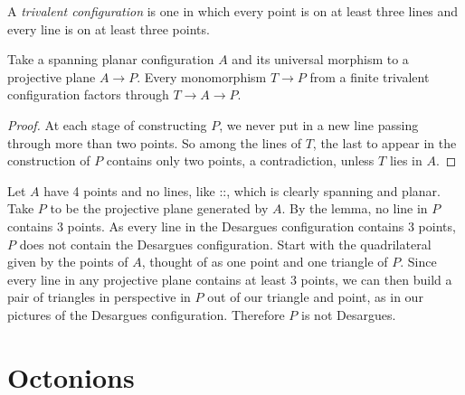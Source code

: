 A \emph{trivalent configuration} is one in which every point is on at least three lines and every line is on at least three points.

\begin{lemma}
Take a spanning planar configuration \(A\) and its universal morphism to a projective plane \(A \to P\).
Every monomorphism \(T \to P\) from a finite trivalent configuration factors through \(T \to A \to P\).
\end{lemma}
\begin{proof}
At each stage of constructing \(P\), we never put in a new line passing through more than two points.
So among the lines of \(T\), the last to appear in the construction of \(P\) contains only two points, a contradiction, unless \(T\) lies in \(A\).
\end{proof}

\begin{example}
Let \(A\) have 4 points and no lines, like ::, which is clearly spanning and planar. 
Take \(P\) to be the projective plane generated by \(A\).
By the lemma, no line in \(P\) contains 3 points.
As every line in the Desargues configuration contains 3 points, \(P\) does not contain the Desargues configuration.
Start with the quadrilateral given by the points of \(A\), thought of as one point and one triangle of \(P\).
Since every line in any projective plane contains at least 3 points, we can then build a pair of triangles in perspective in \(P\) out of our triangle and point, as in our pictures of the Desargues configuration.
Therefore \(P\) is not Desargues. 
\end{example}

\section{Octonions}

